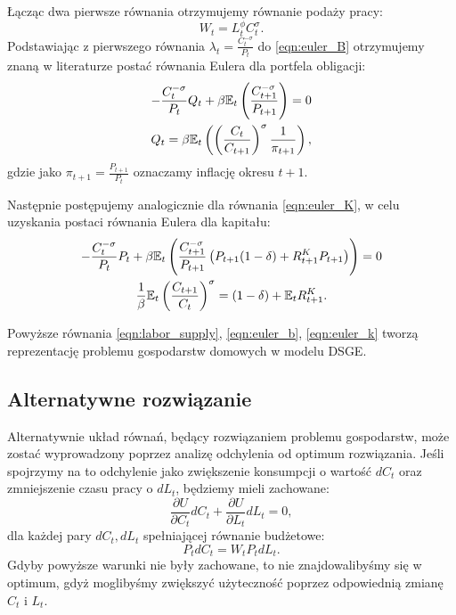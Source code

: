 Łącząc dwa pierwsze równania otrzymujemy równanie podaży pracy:
\begin{equation}
    W_t = L_t^{\phi} C_t^{\sigma} \label{eqn:labor_supply}.
\end{equation}
Podstawiając z pierwszego równania $\lambda_t = \frac{C_t^{-\sigma}}{P_t}$ do \eqref{eqn:euler_B} otrzymujemy znaną w literaturze postać równania Eulera dla portfela obligacji:
\begin{gather}
    -\frac{C_t^{-\sigma}}{P_t} Q_t + \beta \mathbb{E}_t \left( \frac{C_{t+1}^{-\sigma}}{P_{t+1}}\right) = 0 \\
    Q_t = \beta \mathbb{E}_t \left( \left(\frac{C_t}{C_{t+1}}\right)^\sigma \frac{1}{\pi_{t+1}}\right) \label{eqn:euler_b},
\end{gather}
gdzie jako $\pi_{t+1} = \frac{P_{t+1}}{P_t}$ oznaczamy inflację okresu $t+1$.

Następnie postępujemy analogicznie dla równania \eqref{eqn:euler_K}, w celu uzyskania postaci równania Eulera dla kapitału:
\begin{gather}
    -\frac{C_t^{-\sigma}}{P_t} P_t + \beta \mathbb{E}_t \left( \frac{C_{t+1}^{-\sigma}}{P_{t+1}} \left(P_{t+1}(1-\delta) + R^K_{t+1} P_{t+1}\right)\right) = 0 \\
    \frac{1}{\beta}\mathbb{E}_t\left(\frac{C_{t+1}}{C_t}\right)^\sigma = (1-\delta) + \mathbb{E}_t R^K_{t+1} \label{eqn:euler_k}.
\end{gather}

Powyższe równania \eqref{eqn:labor_supply}, \eqref{eqn:euler_b}, \eqref{eqn:euler_k} tworzą reprezentację problemu gospodarstw domowych w modelu DSGE.

\subsection{Alternatywne rozwiązanie}

Alternatywnie układ równań, będący rozwiązaniem problemu gospodarstw, może zostać wyprowadzony poprzez analizę odchylenia od optimum rozwiązania. Jeśli spojrzymy na to odchylenie jako zwiększenie konsumpcji o wartość $dC_t$ oraz zmniejszenie czasu pracy o $dL_t$, będziemy mieli zachowane:
\begin{equation}
    \frac{\partial U}{\partial C_t} dC_t + \frac{\partial U}{\partial L_t} dL_t = 0,
\end{equation}
dla każdej pary $dC_t, dL_t$ spełniającej równanie budżetowe:
\begin{equation}
    P_t dC_t = W_t P_t dL_t.
\end{equation}
Gdyby powyższe warunki nie były zachowane, to nie znajdowalibyśmy się w optimum, gdyż moglibyśmy zwiększyć użyteczność poprzez odpowiednią zmianę $C_t$ i $L_t$. 

